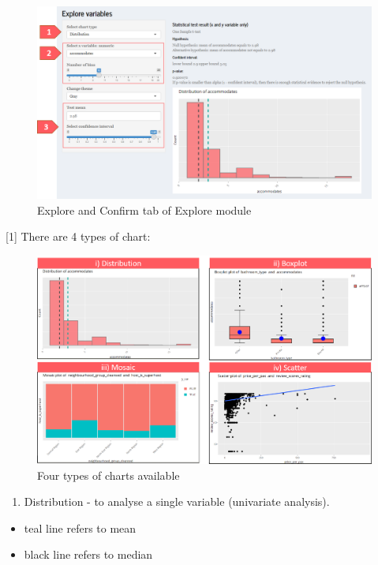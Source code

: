 \documentclass[
  12pt,
]{article}
\providecommand{\tightlist}{%
  \setlength{\itemsep}{0pt}\setlength{\parskip}{0pt}}
\begin{document}
\begin{figure}[H]

{\centering \includegraphics[width=0.95\linewidth]{images/explore2} 

}

\caption{Explore and Confirm tab of Explore module}\label{fig:unnamed-chunk-7}
\end{figure}

{[}1{]} There are 4 types of chart:

\begin{figure}[H]

{\centering \includegraphics[width=0.8\linewidth]{images/plots} 

}

\caption{Four types of charts available}\label{fig:unnamed-chunk-8}
\end{figure}

\begin{enumerate}
\def\labelenumi{\roman{enumi})}
\tightlist
\item
  Distribution - to analyse a single variable (univariate analysis).
\end{enumerate}

\begin{itemize}
\tightlist
\item
  teal line refers to mean\\
\item
  black line refers to median
\end{itemize}
\end{document}
